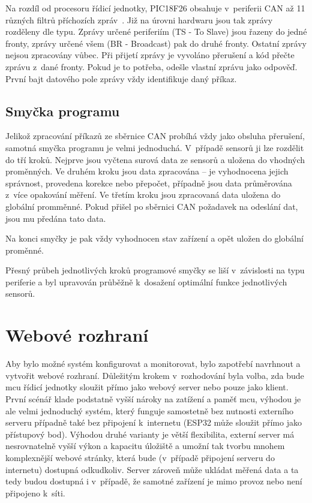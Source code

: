     Na rozdíl od procesoru řídicí jednotky, PIC18F26 obsahuje v~periferii CAN až 11 různých filtrů příchozích zpráv~\cite{PIC18F26Q83}. Již na úrovni hardwaru jsou tak zprávy rozděleny dle typu. Zprávy určené periferiím (TS - To Slave) jsou řazeny do jedné fronty, zprávy určené všem (BR - Broadcast) pak do druhé fronty. Ostatní zprávy nejsou zpracovány vůbec. Při přijetí zprávy je vyvoláno přerušení a kód přečte zprávu z~dané fronty. Pokud je to potřeba, odešle vlastní zprávu jako odpověď. První bajt datového pole zprávy vždy identifikuje daný příkaz. 

\subsection{Smyčka programu}
    Jelikož zpracování příkazů ze sběrnice CAN probíhá vždy jako obsluha přerušení, samotná smyčka programu je velmi jednoduchá.  V~případě sensorů ji lze rozdělit do tří kroků. Nejprve jsou vyčtena surová data ze sensorů a uložena do vhodných proměnných. Ve druhém kroku jsou data zpracována -- je vyhodnocena jejich správnost, provedena korekce nebo přepočet, případně jsou data průměrována z~více opakování měření. Ve třetím kroku jsou zpracovaná data uložena do globální promměnné. Pokud přišel po sběrnici CAN požadavek na odeslání dat, jsou mu předána tato data. 

    Na konci smyčky je pak vždy vyhodnocen stav zařízení a opět uložen do globální proměnné.

    Přesný průbeh jednotlivých kroků programové smyčky se liší v~závislosti na typu periferie a byl upravován průběžně k~dosažení optimální funkce jednotlivých sensorů.




\section{Webové rozhraní}
    Aby bylo možné systém konfigurovat a monitorovat, bylo zapotřebí navrhnout a vytvořit webové rozhraní. Důležitým krokem v~rozhodování byla volba, zda bude \acs{mcu} řídicí jednotky sloužit přímo jako webový server nebo pouze jako klient. První scénář klade podstatně vyšší nároky na zatížení a paměť \acs{mcu}, výhodou je ale velmi jednoduchý systém, který funguje samostetně bez nutnosti externího serveru případně také bez připojení k~internetu (ESP32 může sloužit přímo jako přístupový bod). Výhodou druhé varianty je větší flexibilita, externí server má nesrovnatelně vyšší výkon a kapacitu úložiště a umožní tak tvorbu mnohem komplexnější webové stránky, která bude (v~případě připojení serveru do internetu) dostupná odkudkoliv. Server zároveň může ukládat měřená data a ta tedy budou dostupná i v~případě, že samotné zařízení je mimo provoz nebo není připojeno k~síti.

